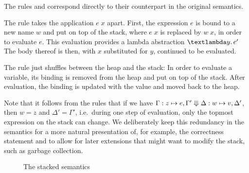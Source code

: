 \documentclass[twopage]{scrartcl}
\newtheorem{lemma}{Lemma}
\theoremstyle{nonumberbreak}
\newcommand{\sApp}[2]{#1\;#2}
\newcommand{\sLam}[2]{\text{\textlambda} #1.\, #2}
\newcommand{\sLet}[2]{\text{\textsf{let}}\ #1\ \text{\textsf{in}}\ #2}
\newcommand{\ssred}[4]{#1 : #2 \mathrel{\rotatebox[origin=c]{90}{$\Lleftarrow$}} #3 : #4}
\newcommand{\sRule}[1]{\text{{\textsc{#1}}}}
\newcommand{\dom}[1]{\text{dom}\;#1}
\newcommand{\xeng}{x_1 = e_1, \ldots, x_n = e_n}
\newcommand{\xen}{x_1\mapsto e_1, \ldots, x_n\mapsto e_n}
\begin{document}
The rules \sRule{Lam} and \sRule{Let} correspond directly to their counterpart in the original semantics.

The rule \sRule{App} takes the application $\sApp e x$ apart. First, the expression $e$ is bound to a new name $w$ and put on top of the stack, where $\sApp e x$ is replaced by $\sApp w x$, in order to evaluate $e$. This evaluation provides a lambda abstraction $\sLam y {e'}$ The body thereof is then, with $x$ substituted for $y$, continued to be evaluated.

The rule \sRule{Var} just shuffles between the heap and the stack: In order to evaluate a variable, its binding is removed from the heap and put on top of the stack. After evaluation, the binding is updated with the value and moved back to the heap.

Note that it follows from the rules that if we have $\ssred \Gamma {z \mapsto e, \Gamma'} {\Delta} {w \mapsto v, \Delta'}$, then $w = z$ and $\Delta' = \Gamma'$, i.e.~during one step of evaluation, only the topmost expression on the stack can change. We deliberately keep this redundancy in the semantics for a more natural presentation of, for example, the correctness statement and to allow for later extensions that might want to modify the stack, such as garbage collection.



\begin{figure}
\caption{The stacked semantics}
\label{fig:stacksem}
\end{figure}
\end{document}
